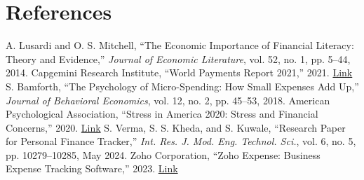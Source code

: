 \documentclass[12pt]{report} %
\begin{document}
\newpage

\chapter{References}
\renewcommand{\bibname}{}
\begin{thebibliography}{9}
\vspace{-25pt}

A. Lusardi and O. S. Mitchell, ``The Economic Importance of Financial Literacy: Theory and Evidence,'' \textit{Journal of Economic Literature}, vol. 52, no. 1, pp. 5--44, 2014.
Capgemini Research Institute, ``World Payments Report 2021,'' 2021. \hyperlink{https://worldpaymentsreport.com}{Link}
S. Bamforth, ``The Psychology of Micro-Spending: How Small Expenses Add Up,'' \textit{Journal of Behavioral Economics}, vol. 12, no. 2, pp. 45--53, 2018.
American Psychological Association, ``Stress in America 2020: Stress and Financial Concerns,'' 2020. \hyperlink{https://www.apa.org/news/press/releases/stress/2020/stress-in-america-finances.pdf}{Link}
S. Verma, S. S. Kheda, and S. Kuwale, ``Research Paper for Personal Finance Tracker,'' \textit{Int. Res. J. Mod. Eng. Technol. Sci.}, vol. 6, no. 5, pp. 10279--10285, May 2024.
Zoho Corporation, ``Zoho Expense: Business Expense Tracking Software,'' 2023.
\hyperlink{https://www.zoho.com/expense/}{Link}


\end{thebibliography}
\end{document}
